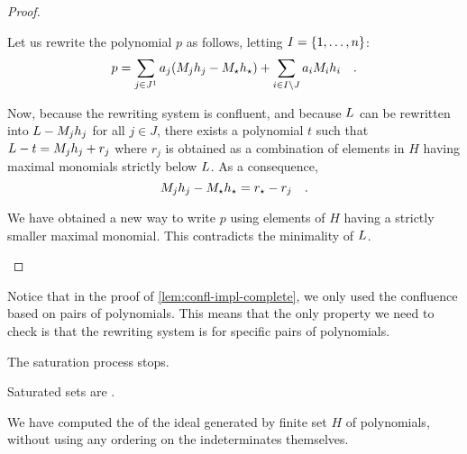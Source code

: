 \begin{proof}
\begin{description}
            Let us rewrite the polynomial $p$
            as follows, letting $I = \{  1, \dots, n \}$:
            \begin{equation}
                p = \sum_{j \in J^1} a_j (\mon_j h_j - \mon_\star h_\star)
                  + 
                    \sum_{i \in I \setminus J} a_i \mon_i h_i
                  \quad .
            \end{equation}

            Now, because the rewriting system is confluent,
            and because
            $\mon[L]$
            can be rewritten into 
            $\mon[L] - \mon_j h_j$
            for all $j \in J$,
            there exists a polynomial $t$ such that
            $\mon[L] - t = 
            \mon_j h_j +  r_j$ where $r_j$ is obtained as a combination of elements 
                    in $H$ having maximal monomials strictly below $\mon[L]$.
            As a consequence,
            \begin{equation*}
                \mon_j h_j - 
                \mon_\star h_\star
                =
                r_\star
                -
                r_j
                \quad .
            \end{equation*}

            We have obtained a new way to write $p$
            using elements of $H$ having a strictly
            smaller maximal monomial. This contradicts
            the minimality of $\mon[L]$.
    \end{description}
\end{proof}

\AP Notice that in the proof of \cref{lem:confl-impl-complete}, we only used
the confluence based on pairs of polynomials. This means that the only property
we need to check is that the rewriting system is  for specific
pairs of polynomials. 

\begin{lemma}
  The saturation process stops.
\end{lemma}

\begin{lemma}
  Saturated sets are .
\end{lemma}

We have computed the  of the ideal generated by
finite set $H$ of polynomials, without using any ordering on the
indeterminates themselves.
